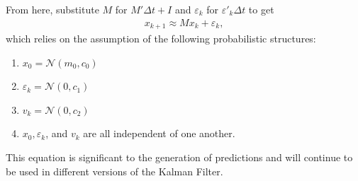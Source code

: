 \noindent From here, substitute $M$ for $M' \Delta t + I$ and $\varepsilon_k$ for  $\varepsilon '_k  \Delta t $ to get
\begin{align*}
	x_{k+1} \approx M x_k + \varepsilon_k,
\end{align*}
which relies on the assumption of the following probabilistic structures:
\begin{enumerate}
\item $x_0 = \mathcal{N}(m_0, c_0) $
\item $\varepsilon_k = \mathcal{N}(0, c_1)$
\item $v_k = \mathcal{N}(0, c_2)$
\item $x_0, \varepsilon_k$, and $ v_k $ are all independent of one another.
\end{enumerate} 

\noindent This equation is significant to the generation of predictions and will continue to be used in different versions of the Kalman Filter. \\ 



